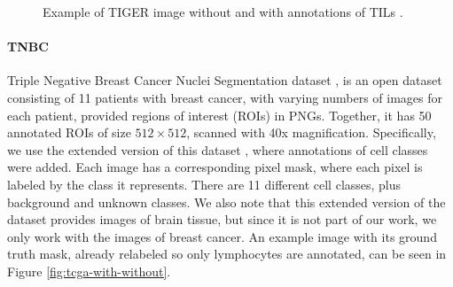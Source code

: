 \begin{figure}[H]
\begin{subfigure}[b]{0.32\textwidth}
    \label{fig:tiger-bbox}
  \end{subfigure}%
  \caption{Example of TIGER image without and with annotations of TILs \cite{tiger_dataset}.}
  \label{fig:tiger-with-without}
\end{figure}

\paragraph{TNBC} Triple Negative Breast Cancer Nuclei Segmentation dataset \cite{TNBC-nuclei-seg}, is an open dataset consisting of 11 patients with breast cancer, with varying numbers of images for each patient, provided regions of interest (ROIs) in PNGs. Together, it has 50 annotated ROIs of size $512\!\times\!512$, scanned with 40x magnification. Specifically, we use the extended version of this dataset \cite{TNBC-nuclei-seg-extended}, where annotations of cell classes were added. Each image has a corresponding pixel mask, where each pixel is labeled by the class it represents. There are 11 different cell classes, plus background and unknown classes. We also note that this extended version of the dataset provides images of brain tissue, but since it is not part of our work, we only work with the images of breast cancer. An example image with its ground truth mask, already relabeled so only lymphocytes are annotated, can be seen in Figure \ref{fig:tcga-with-without}.

